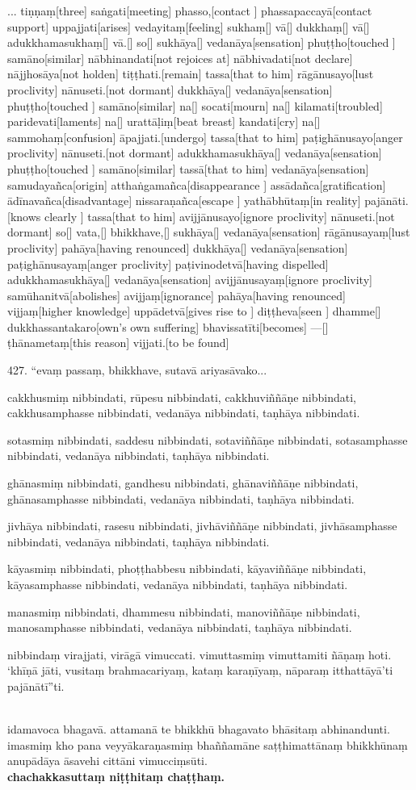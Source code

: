 \documentclass[9pt]{article}
\begin{document}
...
\begingl
tiṇṇaṃ[three] saṅgati[meeting] phasso,[contact ] phassapaccayā[contact support] uppajjati[arises] vedayitaṃ[feeling] sukhaṃ[] vā[] dukkhaṃ[] vā[] adukkhamasukhaṃ[] vā.[] so[] sukhāya[] vedanāya[sensation] phuṭṭho[touched ] samāno[similar] nābhinandati[not rejoices at] nābhivadati[not declare] nājjhosāya[not holden] tiṭṭhati.[remain] tassa[that to him] rāgānusayo[lust proclivity] nānuseti.[not dormant] dukkhāya[] vedanāya[sensation] phuṭṭho[touched ] samāno[similar] na[] socati[mourn] na[] kilamati[troubled] paridevati[laments] na[] urattāḷiṃ[beat breast] kandati[cry] na[] sammohaṃ[confusion] āpajjati.[undergo] tassa[that to him] paṭighānusayo[anger proclivity] nānuseti.[not dormant] adukkhamasukhāya[] vedanāya[sensation] phuṭṭho[touched ] samāno[similar] tassā[that to him] vedanāya[sensation] samudayañca[origin] atthaṅgamañca[disappearance ] assādañca[gratification] ādīnavañca[disadvantage] nissaraṇañca[escape ] yathābhūtaṃ[in reality] pajānāti.[knows clearly ] tassa[that to him] avijjānusayo[ignore proclivity] nānuseti.[not dormant] so[] vata,[] bhikkhave,[] sukhāya[] vedanāya[sensation] rāgānusayaṃ[lust proclivity] pahāya[having renounced] dukkhāya[] vedanāya[sensation] paṭighānusayaṃ[anger proclivity] paṭivinodetvā[having dispelled] adukkhamasukhāya[] vedanāya[sensation] avijjānusayaṃ[ignore proclivity] samūhanitvā[abolishes] avijjaṃ[ignorance] pahāya[having renounced] vijjaṃ[higher knowledge] uppādetvā[gives rise to ] diṭṭheva[seen ] dhamme[] dukkhassantakaro[own's own suffering] bhavissatīti[becomes] —[] ṭhānametaṃ[this reason] vijjati.[to be found]
\endgl
\pagebreak

427. “evaṃ passaṃ, bhikkhave, sutavā ariyasāvako...\

cakkhusmiṃ nibbindati, rūpesu nibbindati, cakkhuviññāṇe nibbindati, cakkhusamphasse nibbindati, vedanāya nibbindati, taṇhāya nibbindati.\

sotasmiṃ nibbindati, saddesu nibbindati, sotaviññāṇe nibbindati, sotasamphasse nibbindati, vedanāya nibbindati, taṇhāya nibbindati.\

ghānasmiṃ nibbindati, gandhesu nibbindati, ghānaviññāṇe nibbindati, ghānasamphasse nibbindati, vedanāya nibbindati, taṇhāya nibbindati.\

jivhāya nibbindati, rasesu nibbindati, jivhāviññāṇe nibbindati, jivhāsamphasse nibbindati, vedanāya nibbindati, taṇhāya nibbindati.\

kāyasmiṃ nibbindati, phoṭṭhabbesu nibbindati, kāyaviññāṇe nibbindati, kāyasamphasse nibbindati, vedanāya nibbindati, taṇhāya nibbindati.\

manasmiṃ nibbindati, dhammesu nibbindati, manoviññāṇe nibbindati, manosamphasse nibbindati, vedanāya nibbindati, taṇhāya nibbindati. \

nibbindaṃ virajjati, virāgā vimuccati. vimuttasmiṃ vimuttamiti ñāṇaṃ hoti. ‘khīṇā jāti, vusitaṃ brahmacariyaṃ, kataṃ karaṇīyaṃ, nāparaṃ itthattāyā’ti pajānātī”ti.\\\

idamavoca bhagavā. attamanā te bhikkhū bhagavato bhāsitaṃ abhinandunti. imasmiṃ kho pana veyyākaraṇasmiṃ bhaññamāne saṭṭhimattānaṃ bhikkhūnaṃ anupādāya āsavehi cittāni vimucciṃsūti.\\[.5cm]

\centering\textbf{chachakkasuttaṃ niṭṭhitaṃ chaṭṭhaṃ.}
\end{document}
